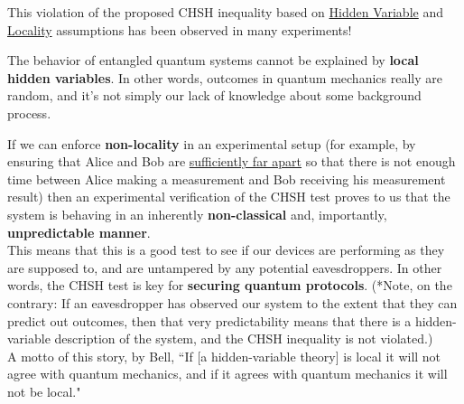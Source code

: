 \documentclass[12pt]{article}
\begin{document}
\begin{remark}
This violation of the proposed CHSH inequality based on \underline{Hidden Variable} and \underline{Locality} assumptions has been observed in many experiments! 
\end{remark}

\begin{theorem}
The behavior of entangled quantum systems cannot be explained by \textbf{local hidden variables}. In other words, outcomes in quantum mechanics really are random, and it’s not simply our lack of knowledge about some background process.
\end{theorem}

\begin{remark}
If we can enforce \textbf{non-locality} in an experimental setup (for example, by ensuring that Alice and Bob are \underline{sufficiently far apart} so that there is not enough time between Alice making a measurement and Bob receiving his measurement result) then an experimental verification of the CHSH test proves to us that the system is behaving in an inherently \textbf{non-classical} and, importantly, \textbf{unpredictable manner}.\\

\noindent This means that this is a good test to see if our devices are performing as they are supposed to, and are untampered by any potential eavesdroppers. In other words, the CHSH test is key for \textbf{securing quantum protocols}. (*Note, on the contrary: If an eavesdropper has observed our system to the extent that they can predict out outcomes, then that very predictability means that there is a hidden-variable description of the system, and the CHSH inequality is not violated.)\\

\noindent A motto of this story, by Bell, ``If [a hidden-variable theory] is local it will not agree with quantum mechanics, and if it agrees with quantum mechanics it will not be local."
\end{remark}
\end{document}
